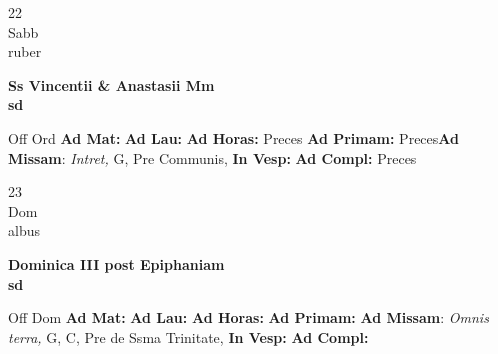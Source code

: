 \documentclass[10pt, openany]{book}
\begin{document}
    \begin{center}
        \begin{minipage}{3.5in}
            \vspace{2em}
            \begin{minipage}{0.5in}
                {\Huge 22} \\
                {\normalsize Sabb} \\
                {\normalsize ruber}
            \end{minipage}
            \begin{minipage}{3.0in}
                \textbf{ \large Ss Vincentii \& Anastasii Mm \\
                \textnormal{\normalsize sd}} \\ 
            \end{minipage}
            \begin{justify}Off Ord
                \textbf{Ad Mat: }
                \textbf{Ad Lau: }
                \textbf{Ad Horas: }Preces
                \textbf{Ad Primam: }Preces\textbf{Ad Missam}: \textit{Intret,} G, Pre Communis,  
                \textbf{In Vesp: }
                \textbf{Ad Compl: }Preces
            \end{justify}
        \end{minipage}
    \end{center}

    \begin{center}
        \begin{minipage}{3.5in}
            \vspace{2em}
            \begin{minipage}{0.5in}
                {\Huge 23} \\
                {\normalsize Dom} \\
                {\normalsize albus}
            \end{minipage}
            \begin{minipage}{3.0in}
                \textbf{ \large Dominica III post Epiphaniam \\
                \textnormal{\normalsize sd}} \\ 
            \end{minipage}
            \begin{justify}Off Dom
                \textbf{Ad Mat: }
                \textbf{Ad Lau: }
                \textbf{Ad Horas: }
                \textbf{Ad Primam: }\textbf{Ad Missam}: \textit{Omnis terra,} G, C, Pre de Ssma Trinitate,  
                \textbf{In Vesp: }
                \textbf{Ad Compl: }
            \end{justify}
        \end{minipage}
    \end{center}
\end{document}
